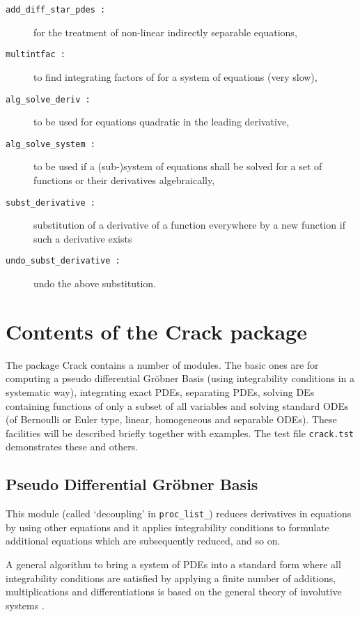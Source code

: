 \documentclass[12pt]{article}
\begin{document}
\begin{description}
\item[{\tt add\_diff\_star\_pdes :}] for the treatment of non-linear
indirectly separable equations,
\item[{\tt multintfac :}] to find integrating factors of for a system
of equations (very slow),
\item[{\tt alg\_solve\_deriv :}] to be used for equations quadratic in
the leading derivative,
\item[{\tt alg\_solve\_system :}] to be used if a (sub-)system of
equations shall be solved for a set of functions or their derivatives
algebraically, 
\item[{\tt subst\_derivative :}] substitution of a derivative of a
function everywhere by a new function if such a derivative exists
\item[{\tt undo\_subst\_derivative :}] undo the above substitution.
\end{description}

\section{Contents of the {\sc Crack} package}
The package {\sc Crack} contains a number of modules. 
The basic ones are for computing a pseudo differential Gr\"{o}bner
Basis (using integrability conditions in a systematic way), integrating
exact PDEs, separating PDEs, solving DEs containing functions of only
a subset of all variables and solving standard ODEs (of Bernoulli or
Euler type, linear, homogeneous and separable ODEs). These facilities
will be described briefly together with examples. The test file
{\tt crack.tst} demonstrates these and others.

\subsection{Pseudo Differential Gr\"{o}bner Basis}
This module (called `decoupling' in {\tt proc\_list\_})
reduces derivatives in equations by using other equations and it applies
integrability conditions to formulate additional equations which are
subsequently reduced, and so on.

A general algorithm to bring a system of PDEs into a standard form
where all integrability conditions are satisfied by applying
a finite number of additions, multiplications and differentiations
is based on the general theory of involutive systems \cite{Riq,Th,Ja}.
\end{document}
